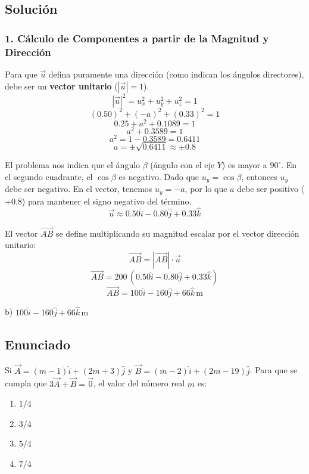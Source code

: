 \documentclass[12pt, a4paper]{article}
\begin{document}
\subsection*{Solución}

\subsubsection*{1. Cálculo de Componentes a partir de la Magnitud y Dirección}
Para que $\vec{u}$ defina puramente una dirección (como indican los ángulos directores), debe ser un \textbf{vector unitario} ($|\vec{u}| = 1$). 
$$ |\vec{u}|^2 = u_x^2 + u_y^2 + u_z^2 = 1 $$
$$ (0.50)^2 + (-a)^2 + (0.33)^2 = 1 $$
$$ 0.25 + a^2 + 0.1089 = 1 $$
$$ a^2 + 0.3589 = 1 $$
$$ a^2 = 1 - 0.3589 = 0.6411 $$
$$ a = \pm\sqrt{0.6411} \approx \pm 0.8 $$

El problema nos indica que el ángulo $\beta$ (ángulo con el eje $Y$) es mayor a $90^\circ$. En el segundo cuadrante, el $\cos\beta$ es negativo. 
Dado que $u_y = \cos\beta$, entonces $u_y$ debe ser negativo. 
En el vector, tenemos $u_y = -a$, por lo que $a$ debe ser positivo ($+0.8$) para mantener el signo negativo del término.
$$ \vec{u} \approx 0.50 \hat{i} - 0.80 \hat{j} + 0.33 \hat{k} $$

El vector $\vec{AB}$ se define multiplicando su magnitud escalar por el vector dirección unitario:
$$ \vec{AB} = |\vec{AB}| \cdot \vec{u} $$
$$ \vec{AB} = 200 \, (0.50 \hat{i} - 0.80 \hat{j} + 0.33 \hat{k}) $$
$$ \vec{AB} = 100 \hat{i} - 160 \hat{j} + 66 \hat{k} \, \text{m} $$

\begin{tcolorbox}[colback=green!5!white, colframe=green!50!black, title=Respuesta Final]
\centering \Large b) $100 \hat{i} - 160 \hat{j} + 66 \hat{k} \, \text{m}$
\end{tcolorbox}

\newpage


\subsection*{Enunciado}
Si $\vec{A} = (m-1)\hat{i} + (2m+3)\hat{j}$ y $\vec{B} = (m-2)\hat{i} + (2m-19)\hat{j}$. Para que se cumpla que $3\vec{A} + \vec{B} = \vec{0}$, el valor del número real $m$ es:
\begin{enumerate}[label=\alph*)]
    \item $1/4$
    \item $3/4$
    \item $5/4$
    \item $7/4$
\end{enumerate}
\end{document}

